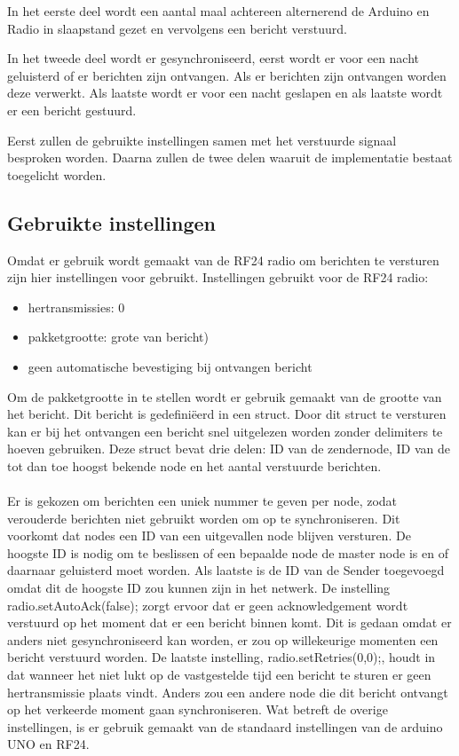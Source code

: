 \documentclass{article}
\begin{document}
In het eerste deel wordt een aantal maal achtereen alternerend de Arduino en Radio in slaapstand gezet en vervolgens een bericht verstuurd.

In het tweede deel wordt er gesynchroniseerd, eerst wordt er voor 
een nacht geluisterd of er berichten zijn ontvangen. Als er berichten zijn ontvangen worden deze verwerkt. Als laatste wordt er voor een nacht geslapen en als laatste wordt er een bericht gestuurd. 

Eerst zullen de gebruikte instellingen samen met het verstuurde signaal besproken worden. Daarna zullen de twee delen waaruit de implementatie bestaat toegelicht worden. 

\subsection{Gebruikte instellingen}
Omdat er gebruik wordt gemaakt van de RF24 radio om berichten te versturen zijn hier instellingen voor gebruikt. 
Instellingen gebruikt voor de RF24 radio:
\begin{itemize}
  \item hertransmissies: 0
  \item pakketgrootte: grote van bericht)
  \item geen automatische bevestiging bij ontvangen bericht
\end{itemize}
Om de pakketgrootte in te stellen wordt er gebruik gemaakt van de grootte van het bericht. Dit bericht is gedefini\"eerd in een  struct. Door dit struct te versturen kan er bij het ontvangen een bericht snel uitgelezen worden zonder delimiters te hoeven gebruiken. Deze struct bevat drie delen: ID van de zendernode, ID van de tot dan toe hoogst bekende node en het aantal verstuurde berichten. \\
\\
Er is gekozen om berichten een uniek nummer te geven per node, zodat verouderde berichten niet gebruikt worden om op te synchroniseren. Dit voorkomt dat nodes een ID van een uitgevallen node blijven versturen.
De hoogste ID is nodig om te beslissen of een bepaalde node de master node is en of daarnaar geluisterd moet worden. 
Als laatste is de ID van de Sender toegevoegd omdat dit de hoogste ID zou kunnen zijn in het netwerk. 
De instelling radio.setAutoAck(false); zorgt ervoor dat er geen acknowledgement wordt verstuurd op het moment dat er een bericht binnen komt. Dit is gedaan omdat er anders niet gesynchroniseerd kan worden, er zou op willekeurige momenten een bericht verstuurd worden. 
De laatste instelling, radio.setRetries(0,0);, houdt in dat wanneer het niet lukt op de vastgestelde tijd een bericht te sturen er geen hertransmissie plaats vindt. Anders zou een andere node die dit bericht ontvangt op het verkeerde moment gaan synchroniseren. 
Wat betreft de overige instellingen, is er gebruik gemaakt van de standaard instellingen van de arduino UNO en RF24.
\end{document}

